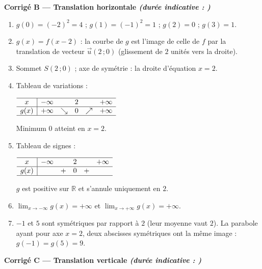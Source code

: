 \documentclass[11pt,a4paper]{article}
\newcommand{\R}{\mathbb{R}}
\newcommand{\partie}[2]{%
  \vspace{6pt}
  \noindent\colorbox{blue!12}{\parbox{\dimexpr\linewidth-2\fboxsep}{%
    \bfseries\color{blue!50!black} #1 \hfill \normalfont\small\itshape (durée indicative : #2)}}%
  \vspace{4pt}}
\begin{document}
\partie{Corrigé B — Translation horizontale}{}

\begin{enumerate}[leftmargin=1.4em,itemsep=3pt]
  \item $g(0)=(-2)^2=4$ ; $g(1)=(-1)^2=1$ ; $g(2)=0$ ; $g(3)=1$.

  \item $g(x)=f(x-2)$ : la courbe de $g$ est l'image de celle de $f$ par la translation de vecteur
  $\vec{u}(2\,;0)$ (glissement de $2$ unités vers la droite).

  \item Sommet $S(2\,;0)$ ; axe de symétrie : la droite d'équation $x=2$.

  \item Tableau de variations :
  \begin{center}
  $\begin{array}{c|ccccc}
  \hline
  x & -\infty & & 2 & & +\infty\\ \hline
  g(x) & +\infty & \searrow & 0 & \nearrow & +\infty\\ \hline
  \end{array}$
  \end{center}
  Minimum $0$ atteint en $x=2$.

  \item Tableau de signes :
  \begin{center}
  $\begin{array}{c|ccccc}
  \hline
  x & -\infty & & 2 & & +\infty\\ \hline
  g(x) & & + & 0 & + & \\ \hline
  \end{array}$
  \end{center}
  $g$ est positive sur $\R$ et s'annule uniquement en $2$.

  \item $\displaystyle\lim_{x\to-\infty}g(x)=+\infty$ et $\displaystyle\lim_{x\to+\infty}g(x)=+\infty$.

  \item $-1$ et $5$ sont symétriques par rapport à $2$ (leur moyenne vaut $2$). La parabole ayant pour axe
  $x=2$, deux abscisses symétriques ont la même image : $g(-1)=g(5)=9$.
\end{enumerate}

\partie{Corrigé C — Translation verticale}{}
\end{document}
